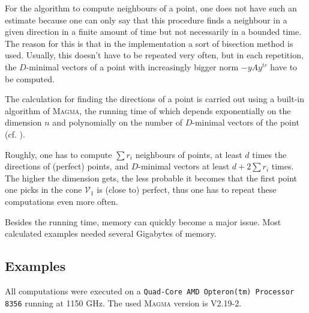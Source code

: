 \documentclass[10pt, preprint]{elsarticle}
\theoremstyle{definition}
\theoremstyle{definition}
\newcommand{\V}{\mathcal{V}}
\begin{document}
For the algorithm to compute neighbours of a point, one does not have such an estimate because one can only say that this procedure finds a neighbour in a given direction in a finite amount of time but not necessarily in a bounded time. The reason for this is that in the implementation a sort of bisection method is used. Usually, this doesn't have to be repeated very often, but in each repetition, the $D$-minimal vectors of a point with increasingly bigger norm $-yAy^{tr}$ have to be computed.

The calculation for finding the directions of a point is carried out using a built-in algorithm of \textsc{Magma}, the running time of which depends exponentially on the dimension $n$ and polynomially on the number of $D$-minimal vectors of the point (cf. \cite{Chazelle}).

Roughly, one has to compute $\sum r_i$ neighbours of points, at least $d$ times the directions of (perfect) points, and $D$-minimal vectors at least $d+2\sum r_i$ times. The higher the dimension gets, the less probable it becomes that the first point one picks in the cone $\V_1$ is (close to) perfect, thus one has to repeat these computations even more often.  

Besides the running time, memory can quickly become a major issue. Most calculated examples needed several Gigabytes of memory.
\subsection{Examples}\label{secEx}
All computations were executed on a \texttt{Quad-Core AMD Opteron(tm) Processor 8356} running at 1150 GHz. The used \textsc{Magma} version is V2.19-2.
\end{document}
